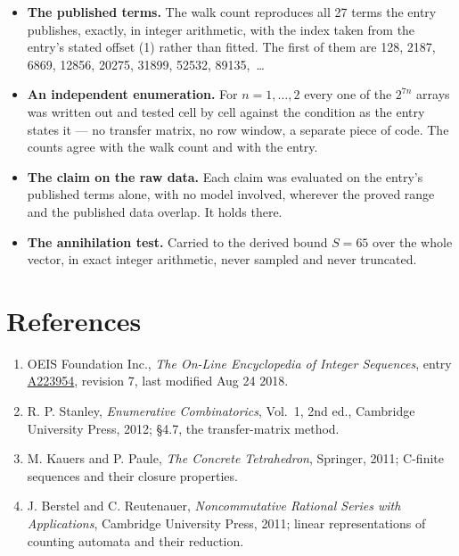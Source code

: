 \documentclass[11pt]{article}
\theoremstyle{definition}
\begin{document}
\begin{itemize}

\item {\bfseries The published terms.} The walk count reproduces all 27 terms the entry publishes, exactly, in integer arithmetic, with the index taken from the entry's stated offset (1) rather than fitted. The first of them are 128, 2187, 6869, 12856, 20275, 31899, 52532, 89135,~\dots

\item {\bfseries An independent enumeration.} For $n = 1,\dots,2$ every one of the $2^{7n}$ arrays was written out and tested cell by cell against the condition as the entry states it --- no transfer matrix, no row window, a separate piece of code. The counts agree with the walk count and with the entry.

\item {\bfseries The claim on the raw data.} Each claim was evaluated on the entry's published terms alone, with no model involved, wherever the proved range and the published data overlap. It holds there.

\item {\bfseries The annihilation test.} Carried to the derived bound $S = 65$ over the whole vector, in exact integer arithmetic, never sampled and never truncated.

\end{itemize}

\section{References}

\begin{enumerate}

\item OEIS Foundation Inc., \emph{The On-Line Encyclopedia of Integer Sequences}, entry \href{https://oeis.org/A223954}{A223954}, revision 7, last modified Aug 24 2018.

\item R. P. Stanley, \emph{Enumerative Combinatorics}, Vol.~1, 2nd ed., Cambridge University Press, 2012; \S4.7, the transfer-matrix method.

\item M. Kauers and P. Paule, \emph{The Concrete Tetrahedron}, Springer, 2011; C-finite sequences and their closure properties.

\item J. Berstel and C. Reutenauer, \emph{Noncommutative Rational Series with Applications}, Cambridge University Press, 2011; linear representations of counting automata and their reduction.

\end{enumerate}
\end{document}
